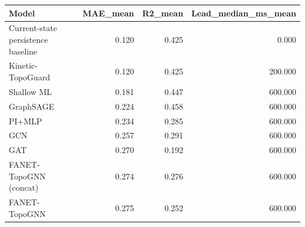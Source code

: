 \begin{tabular}{lrrr}
\toprule
Model & MAE\_mean & R2\_mean & Lead\_median\_ms\_mean \\
\midrule
Current-state persistence baseline & 0.120 & 0.425 & 0.000 \\
Kinetic-TopoGuard & 0.120 & 0.425 & 200.000 \\
Shallow ML & 0.181 & 0.447 & 600.000 \\
GraphSAGE & 0.224 & 0.458 & 600.000 \\
PI+MLP & 0.234 & 0.285 & 600.000 \\
GCN & 0.257 & 0.291 & 600.000 \\
GAT & 0.270 & 0.192 & 600.000 \\
FANET-TopoGNN (concat) & 0.274 & 0.276 & 600.000 \\
FANET-TopoGNN & 0.275 & 0.252 & 600.000 \\
\bottomrule
\end{tabular}